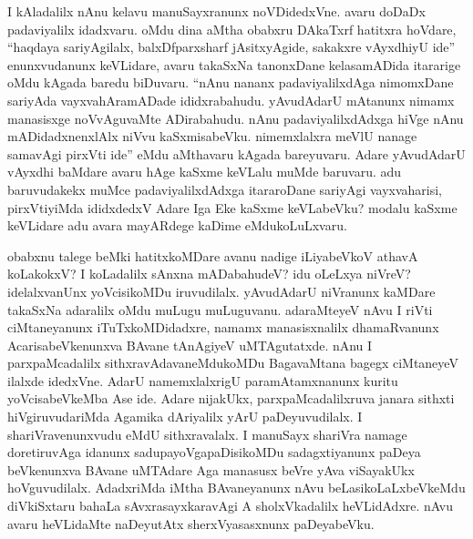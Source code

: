 I kAladalilx nAnu kelavu manuSayxranunx noVDidedxVne. avaru doDaDx padaviyalilx idadxvaru. oMdu dina aMtha obabxru DAkaTxrf hatitxra hoVdare, ``haqdaya sariyAgilalx, balxDfparxsharf jAsitxyAgide, sakakxre vAyxdhiyU ide'' enunxvudanunx keVLidare, avaru takaSxNa tanonxDane kelasamADida itararige oMdu kAgada baredu biDuvaru. ``nAnu nananx padaviyalilxdAga nimomxDane sariyAda vayxvahAramADade ididxrabahudu. yAvudAdarU mAtanunx nimamx manasisxge noVvAguvaMte ADirabahudu. nAnu padaviyalilxdAdxga hiVge nAnu mADidadxnenxlAlx niVvu kaSxmisabeVku. nimemxlalxra meVlU nanage samavAgi pirxVti ide'' eMdu aMthavaru kAgada bareyuvaru. Adare yAvudAdarU vAyxdhi baMdare avaru hAge kaSxme keVLalu muMde baruvaru. adu baruvudakekx muMce padaviyalilxdAdxga itararoDane sariyAgi vayxvaharisi, pirxVtiyiMda ididxdedxV Adare Iga Eke kaSxme keVLabeVku? modalu kaSxme keVLidare adu avara mayARdege kaDime eMdukoLuLxvaru.

obabxnu talege beMki hatitxkoMDare avanu nadige iLiyabeVkoV athavA koLakokxV? I koLadalilx sAnxna mADabahudeV? idu oLeLxya niVreV? idelalxvanUnx yoVcisikoMDu iruvudilalx. yAvudAdarU niVranunx kaMDare takaSxNa adaralilx oMdu muLugu muLuguvanu. adaraMteyeV nAvu I riVti ciMtaneyanunx iTuTxkoMDidadxre, namamx manasisxnalilx dhamaRvanunx AcarisabeVkenunxva BAvane tAnAgiyeV uMTAgutatxde. nAnu I parxpaMcadalilx sithxravAdavaneMdukoMDu BagavaMtana bagegx ciMtaneyeV ilalxde idedxVne. AdarU namemxlalxrigU paramAtamxnanunx kuritu yoVcisabeVkeMba Ase ide. Adare nijakUkx, parxpaMcadalilxruva janara sithxti hiVgiruvudariMda Agamika dAriyalilx yArU paDeyuvudilalx. I shariVravenunxvudu eMdU sithxravalalx. I manuSayx shariVra namage doretiruvAga idanunx sadupayoVgapaDisikoMDu sadagxtiyanunx paDeya beVkenunxva BAvane uMTAdare Aga manasusx beVre yAva viSayakUkx hoVguvudilalx. AdadxriMda iMtha BAvaneyanunx nAvu beLasikoLaLxbeVkeMdu diVkiSxtaru bahaLa sAvxrasayxkaravAgi A sholxVkadalilx heVLidAdxre. nAvu avaru heVLidaMte naDeyutAtx sherxVyasasxnunx paDeyabeVku.













































 

